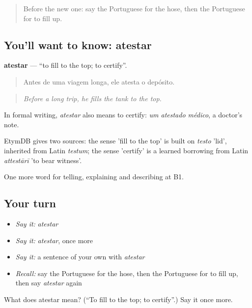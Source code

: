 \label{lesson:PT-C404-atestar}



\begin{quote}
Before the new one: say the Portuguese for the hose, then the Portuguese for to fill up.
\end{quote}

\subsection*{You'll want to know: atestar}
\textbf{atestar} — \textquotedblleft{}to fill to the top; to certify\textquotedblright{}.

\begin{quote}
Antes de uma viagem longa, ele atesta o depósito.
\end{quote}

\begin{quote}
\emph{Before a long trip, he fills the tank to the top.}
\end{quote}

In formal writing, \emph{atestar} also means to certify: \emph{um atestado médico}, a doctor's note.

\begin{cousinweb}
EtymDB gives two sources: the sense 'fill to the top' is built on \emph{testo} 'lid', inherited from Latin \emph{testum}; the sense 'certify' is a learned borrowing from Latin \emph{attestārī} 'to bear witness'.
\end{cousinweb}

\begin{grammarlens}[title={What you've built}]
One more word for telling, explaining and describing at B1.
\end{grammarlens}

\subsection*{Your turn}
\begin{itemize}
\raggedright
  \item \emph{Say it:} \emph{atestar}
  \item \emph{Say it:} \emph{atestar}, once more
  \item \emph{Say it:} a sentence of your own with \emph{atestar}
  \item \emph{Recall:} say the Portuguese for the hose, then the Portuguese for to fill up, then say \emph{atestar} again
\end{itemize}

\begin{tcolorbox}[breakable,colback=teal!4,colframe=teal!35!black,title={Before you move on}]
What does atestar mean? (\textquotedblleft{}To fill to the top; to certify\textquotedblright{}.) Say it once more.
\end{tcolorbox}
